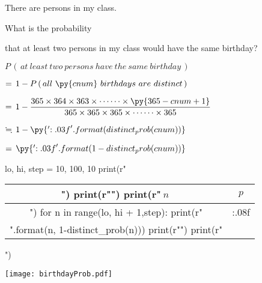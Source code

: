 \documentclass[a4paper, 12pt]{article}
\begin{document}
    
    
    There are  persons in my class.\vspace{5mm}
    
    What is the probability
    
    \hspace{25mm} that at least two persons in my class would have the same birthday? \vspace{5mm}
       
	\hspace{15mm}$P\, (\,at~ least ~two~ persons~have~ the~same~ birthday\,)$
	
    \hspace{10mm}$= \,1 - P\, (\,all~ \py{cnum}~ birthdays~ are ~distinct\,)$\vspace{2mm}
    
   \hspace{10mm}$=\,1-\displaystyle \frac{365\times 364\times 363\times \cdots\cdots\times \py{365-cnum+1}}
            {\,365\times 365 \times 365 \times\cdots\cdots\times 365\,}$\vspace{2mm}
            
   \hspace{10mm}$\fallingdotseq \,1- \py{'{:.03f}'.format(distinct_prob(cnum))}$
   
    \hspace{10mm}$= \,\py{'{:.03f}'.format(1-distinct_prob(cnum))}$\vspace{30mm}
    
\begin{pycode}
lo, hi, step = 10, 100, 10
print(r"\begin{tabular}{|c|c|}")
print(r"\hline")
print(r"$~n~$ & $~p~$ \\ \hline")
for n in range(lo, hi + 1,step):
    print(r"{} & {:.08f} \\".format(n, 1-distinct_prob(n)))
    print(r"\hline")
print(r"\end{tabular}")
\end{pycode}   
 
      \vspace{-96mm}\hspace{40mm}
      \texttt{[image: birthdayProb.pdf]}         
\end{document}
